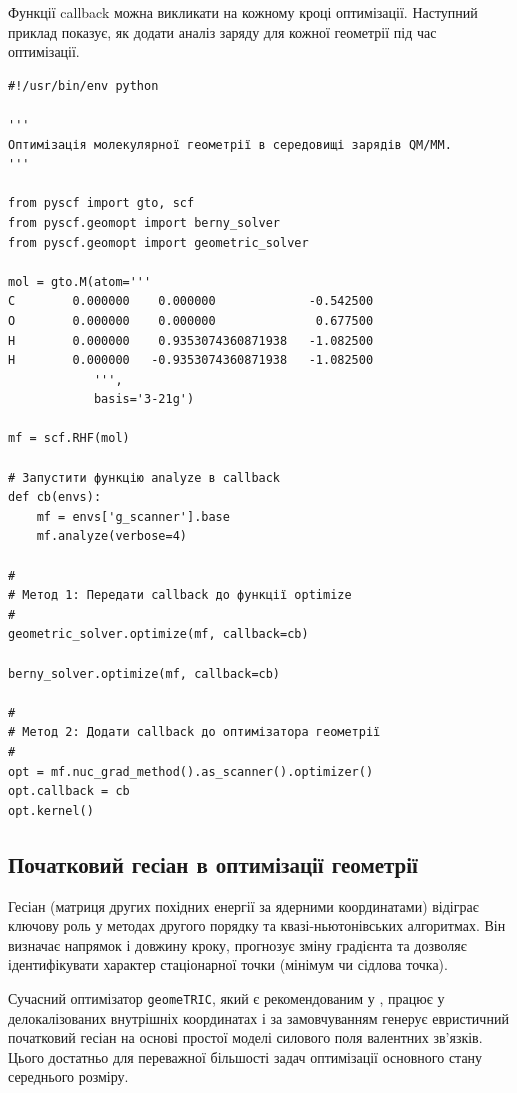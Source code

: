 Функції callback можна викликати на кожному кроці оптимізації. Наступний приклад показує, як додати аналіз заряду для кожної геометрії під час оптимізації.

\begin{verbatim}
#!/usr/bin/env python

'''
Оптимізація молекулярної геометрії в середовищі зарядів QM/MM.
'''

from pyscf import gto, scf
from pyscf.geomopt import berny_solver
from pyscf.geomopt import geometric_solver

mol = gto.M(atom='''
C        0.000000    0.000000             -0.542500
O        0.000000    0.000000              0.677500
H        0.000000    0.9353074360871938   -1.082500
H        0.000000   -0.9353074360871938   -1.082500
            ''',
            basis='3-21g')

mf = scf.RHF(mol)

# Запустити функцію analyze в callback
def cb(envs):
    mf = envs['g_scanner'].base
    mf.analyze(verbose=4)

#
# Метод 1: Передати callback до функції optimize
#
geometric_solver.optimize(mf, callback=cb)

berny_solver.optimize(mf, callback=cb)

#
# Метод 2: Додати callback до оптимізатора геометрії
#
opt = mf.nuc_grad_method().as_scanner().optimizer()
opt.callback = cb
opt.kernel()
\end{verbatim}

\subsection{Початковий гесіан в оптимізації геометрії}

Гесіан (матриця других похідних енергії за ядерними координатами) відіграє ключову роль у методах другого порядку та квазі-ньютонівських алгоритмах. Він визначає напрямок і довжину кроку, прогнозує зміну градієнта та дозволяє ідентифікувати характер стаціонарної точки (мінімум чи сідлова точка).

Сучасний оптимізатор \texttt{geomeTRIC}, який є рекомендованим у \PySCF{}, працює у делокалізованих внутрішніх координатах і за замовчуванням генерує евристичний початковий гесіан на основі простої моделі силового поля валентних зв’язків. Цього достатньо для переважної більшості задач оптимізації основного стану середнього розміру.

